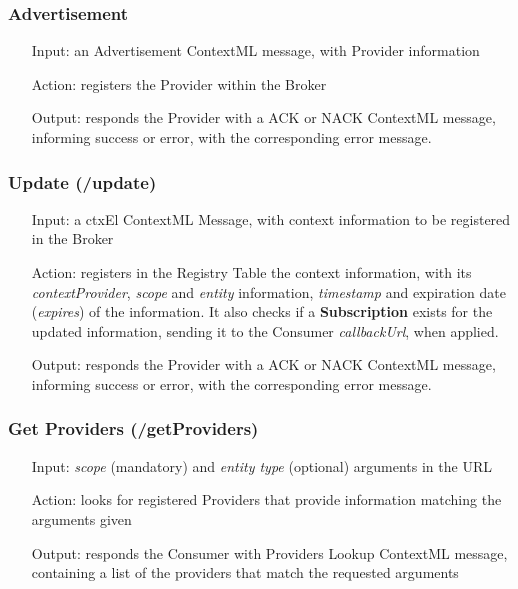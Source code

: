 \subsubsection{Advertisement}
\begin{itemize}
	\item[Input:] an Advertisement ContextML message, with Provider information
	
	\item[Action:] registers the Provider within the Broker
	
	\item[Output:] responds the Provider with a ACK or NACK ContextML message, informing success or error, with the corresponding error message.
\end{itemize}

\subsubsection{Update (/update)}
\begin{itemize}
	\item[Input:] a ctxEl ContextML Message, with context information to be registered in the Broker
	
	\item[Action:] registers in the Registry Table the context information, with its \textit{contextProvider}, \textit{scope} and \textit{entity} information, \textit{timestamp} and expiration date (\textit{expires}) of the information. It also checks if a \textbf{Subscription} exists for the updated information, sending it to the Consumer \textit{callbackUrl}, when applied.
	
	\item[Output:] responds the Provider with a ACK or NACK ContextML message, informing success or error, with the corresponding error message.
\end{itemize}

\subsubsection{Get Providers (/getProviders)}
\begin{itemize}
	\item[Input:] \textit{scope} (mandatory) and \textit{entity type} (optional) arguments in the URL
	
	\item[Action:] looks for registered Providers that provide information matching the arguments given
	
	\item[Output:] responds the Consumer with Providers Lookup ContextML message, containing a list of the providers that match the requested arguments
\end{itemize}

